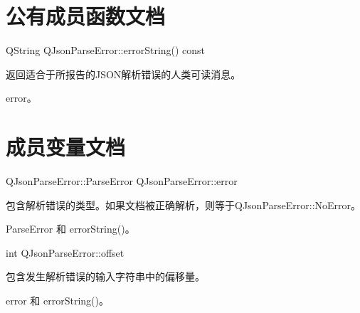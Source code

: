\section{公有成员函数文档}

QString QJsonParseError::errorString() const

返回适合于所报告的JSON解析错误的人类可读消息。


\begin{notice}[另外参阅]
error。
\end{notice}

\section{成员变量文档}

QJsonParseError::ParseError QJsonParseError::error

包含解析错误的类型。如果文档被正确解析，则等于QJsonParseError::NoError。


\begin{notice}[另外参阅]
ParseError 和 errorString()。
\end{notice}

int QJsonParseError::offset

包含发生解析错误的输入字符串中的偏移量。



\begin{notice}[另外参阅]
	error 和 errorString()。
\end{notice}